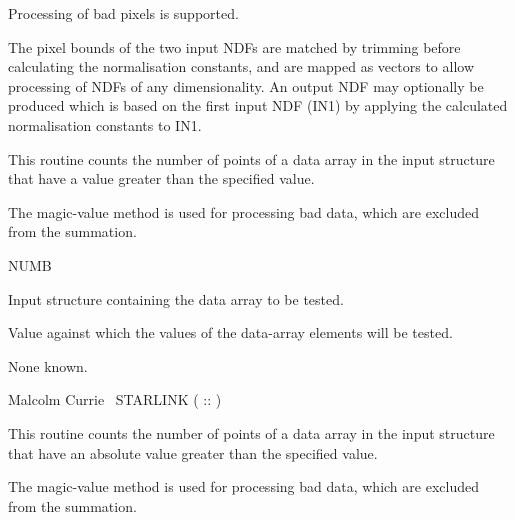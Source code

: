 {{{{         \sstitem
         Processing of bad pixels is supported.

         \sstitem
         The pixel bounds of the two input NDFs are matched by trimming
         before calculating the normalisation constants, and are mapped as
         vectors to allow processing of NDFs of any dimensionality. An
         output NDF may optionally be produced which is based on the
         first input NDF (IN1) by applying the calculated normalisation
         constants to IN1.
      }
   }
}
 
\begin{manroutinedescription}
  This routine counts the number of points of a data array in the
  input {} structure that have a value greater than the
  specified value.

  The magic-value method is used for processing bad data, which are
  excluded from the summation.

  NUMB

\begin{manparametertable}
  Input {} structure containing the data array to be tested.
\end{manparametertable}
\begin{manparametertable}
  Value against which the values of the data-array elements will
  be tested.
\end{manparametertable}
  None known.

  Malcolm Currie ~STARLINK ( {}::{} )
\end{manroutinedescription}

\begin{manroutinedescription}
  This routine counts the number of points of a data array in the
  input {} structure that have an absolute value greater
  than the specified value.

  The magic-value method is used for processing bad data, which are
  excluded from the summation.


\end{manroutinedescription}}
